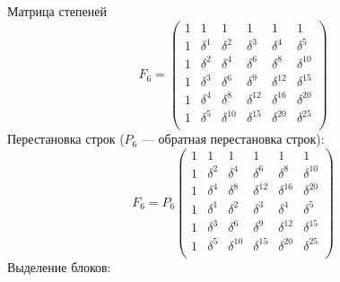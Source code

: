 Матрица степеней
\[
    F_6
    = \begin{pmatrix}
          1 & 1        & 1           & 1           & 1           & 1           \\
          1 & \delta^1 & \delta^2    & \delta^3    & \delta^4    & \delta^5    \\
          1 & \delta^2 & \delta^4    & \delta^6    & \delta^8    & \delta^{10} \\
          1 & \delta^3 & \delta^6    & \delta^9    & \delta^{12} & \delta^{15} \\
          1 & \delta^4 & \delta^8    & \delta^{12} & \delta^{16} & \delta^{20} \\
          1 & \delta^5 & \delta^{10} & \delta^{15} & \delta^{20} & \delta^{25} \\
    \end{pmatrix}
\]
Перестановка строк ($P_6$ --- обратная перестановка строк):
\[
    F_6
    = P_6
    \begin{pmatrix}
        1 & 1        & 1           & 1           & 1           & 1           \\
        1 & \delta^2 & \delta^4    & \delta^6    & \delta^8    & \delta^{10} \\
        1 & \delta^4 & \delta^8    & \delta^{12} & \delta^{16} & \delta^{20} \\
        1 & \delta^1 & \delta^2    & \delta^3    & \delta^4    & \delta^5    \\
        1 & \delta^3 & \delta^6    & \delta^9    & \delta^{12} & \delta^{15} \\
        1 & \delta^5 & \delta^{10} & \delta^{15} & \delta^{20} & \delta^{25} \\
    \end{pmatrix}
\]
Выделение блоков:
